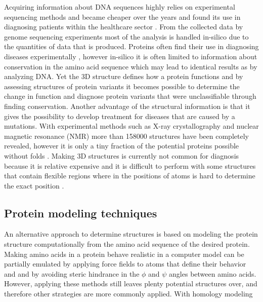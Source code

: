 Acquiring information about DNA sequences highly relies on experimental sequencing methods and became cheaper over the years \cite{} and found its use in diagnosing patients within the healthcare sector \cite{}.
From the collected data by genome sequencing experiments most of the analysis is handled in-silico due to the quantities of data that is produced. Proteins often find their use in diagnosing diseases experimentally \cite{}, however in-silico it is often limited to information about conservation in the amino acid sequence which may lead to identical results as by analyzing DNA.
Yet the 3D structure defines how a protein functions \cite{} and by assessing structures of protein variants it becomes possible to determine the change in function and diagnose protein variants that were unclassifiable through finding conservation.
Another advantage of the structural information is that it gives the possibility to develop treatment for diseases that are caused by a mutations. 
With experimental methods such as X-ray crystallography and nuclear magnetic resonance (NMR) more than 158000 structures \cite{} have been completely revealed, however it is only a tiny fraction of the potential proteins possible without folds \cite{}.
Making 3D structures is currently not common for diagnosis because it is relative expensive and it is difficult to perform with some structures that contain flexible regions where in the positions of atoms is hard to determine the exact position \cite{}.

\subsection{Protein modeling techniques}

An alternative approach to determine structures is based on modeling the protein structure computationally from the amino acid sequence of the desired protein. Making amino acids in a protein behave realistic in a computer model can be partially emulated by applying force fields \cite{} to atoms that define their behavior and and by avoiding steric hindrance in the $\phi$ and $\psi$ angles between amino acids.
However, applying these methods still leaves plenty potential structures over, and therefore other strategies are more commonly applied. With homology modeling 

